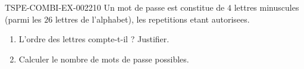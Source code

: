 \begin{exercice}{TSPE-COMBI-EX-002}{2}{10}
Un mot de passe est constitue de $4$ lettres minuscules (parmi les $26$ lettres de l'alphabet), les repetitions etant autorisees.
\begin{enumerate}
  \item L'ordre des lettres compte-t-il ? Justifier.
  \item Calculer le nombre de mots de passe possibles.
\end{enumerate}
\end{exercice}
